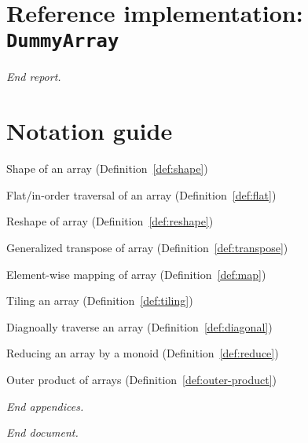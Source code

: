 \documentclass{DIKU-report-variant}
\newcommand\mrm[1]{\mathrm{#1}}
\newcommand\brm[1]{\bm{\mrm{#1}}}
\newcommand\reduce{\operatorname*{\brm{reduce}\,}}
\newcommand\diag{\operatorname*{\brm{diag}\,}}
\newcommand\tile{\operatorname*{\brm{tile}\,}}
\newcommand\oprodby[1]{\mathop{\operatorname*{\,\brm{by}}_{#1}}}
\begin{document}
\section{Reference implementation: \texttt{DummyArray}}



\vfill
\begin{center}\itshape End report.\end{center}
\clearpage

\appendix
\renewcommand\thesection{\Alph{section}}
{}

\section{Notation guide}

\begin{description}[align=right,labelwidth=7em]
  \item[\(\sharp A\)] Shape of an array (Definition~\ref{def:shape})
  \item[\(\flat A\)] Flat/in-order traversal of an array (Definition~\ref{def:flat})
  \item[\(\varrho(A, \rho)\)] Reshape of array (Definition~\ref{def:reshape})
  \item[\(A \circ \sigma\)] Generalized transpose of array (Definition~\ref{def:transpose})
  \item[\(f \circ A\)] Element-wise mapping of array (Definition~\ref{def:map})
  \item[\(\tile_{\times k, x} A\)] Tiling an array (Definition~\ref{def:tiling})
  \item[\(\diag_{x, y} A\)] Diagnoally traverse an array (Definition~\ref{def:diagonal})
  \item[\(\reduce^k_{(S, \oplus, \epsilon)} A\)] Reducing an array by a monoid (Definition~\ref{def:reduce})
  \item[\(A \oprodby f B\)] Outer product of arrays (Definition~\ref{def:outer-product})
\end{description}

\vfill
\begin{center}\itshape End appendices.\end{center}
\clearpage

{}
\printbibliography

\vfill
\begin{center}\itshape End document.\end{center}
\end{document}
